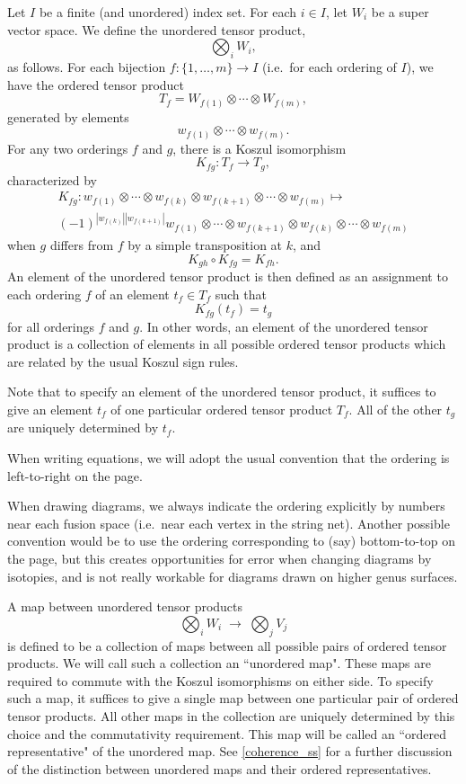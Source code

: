 \documentclass[12pt,a4paper]{article}
\newcommand\be            {\begin{equation}}
\newcommand\ee            {\end{equation}}
\begin{document}
Let $I$ be a finite (and unordered) index set.
For each $i\in I$, let $W_i$ be a super vector space.
We define the unordered tensor product,
\be
	\bigotimes_i W_i ,
\ee
as follows.
For each bijection $f: \{1, \ldots,m\} \to I$ (i.e.\ for each ordering of $I$),
we have the ordered tensor product
\be
	T_f = W_{f(1)}\otimes\cdots\otimes W_{f(m)} ,
\ee
generated by elements
\be
	w_{f(1)}\otimes\cdots\otimes w_{f(m)}.
\ee
For any two orderings $f$ and $g$, there is a Koszul isomorphism
\be
	K_{fg} : T_f \to T_g ,
\ee
characterized by
\begin{multline}
	K_{fg} : w_{f(1)}\otimes\cdots\otimes w_{f(k)} \otimes w_{f(k+1)} \otimes \cdots \otimes w_{f(m)} \mapsto \\
				(-1)^{|w_{f(k)}||w_{f(k+1)}|} w_{f(1)}\otimes\cdots\otimes w_{f(k+1)} \otimes w_{f(k)} \otimes \cdots \otimes w_{f(m)}
\end{multline}
when $g$ differs from $f$ by a simple transposition at $k$, and
\be
	K_{gh} \circ K_{fg} = K_{fh} .
\ee
An element of the unordered tensor product is then defined as an assignment to each ordering $f$ of an element $t_f\in T_f$
such that
\be
	K_{fg}(t_f) = t_g
\ee
for all orderings $f$ and $g$.
In other words, an element of the unordered tensor product is a collection of elements in all 
possible ordered tensor products which are related by the usual Koszul sign rules.

Note that to specify an element of the unordered tensor product, it suffices to give an element $t_f$ of one
particular ordered tensor product $T_f$.
All of the other $t_g$ are uniquely determined by $t_f$.

When writing equations, we will adopt the usual convention that the ordering is left-to-right on the page.

When drawing diagrams, we always indicate the ordering explicitly by numbers near each fusion space (i.e.\ near
each vertex in the string net).
Another possible convention would be to use the ordering corresponding to (say) bottom-to-top on the page,
but this creates opportunities for error when changing diagrams by isotopies,
and is not really workable for diagrams drawn on higher genus surfaces.

A map between unordered tensor products
\be
	\bigotimes_i W_i \; \to \; \bigotimes_j V_j
\ee
is defined to be a collection of maps between
all possible pairs of ordered tensor products.
We will call such a collection an ``unordered map".
These maps are required to commute with the Koszul isomorphisms on either side.
To specify such a map, it suffices to give a single map between one particular pair of ordered tensor products.
All other maps in the collection are uniquely determined by this choice and the commutativity requirement.
This map will be called an ``ordered representative" of the unordered map.
See \ref{coherence_ss} for a further discussion of the distinction between unordered maps and
their ordered representatives.
\end{document}

